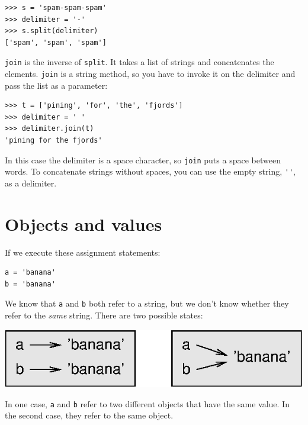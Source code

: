 \documentclass[10pt]{book}
\begin{document}

\beforeverb
\begin{verbatim}
>>> s = 'spam-spam-spam'
>>> delimiter = '-'
>>> s.split(delimiter)
['spam', 'spam', 'spam']
\end{verbatim}
\afterverb
%
{\tt join} is the inverse of {\tt split}.  It
takes a list of strings and
concatenates the elements.  {\tt join} is a string method,
so you have to invoke it on the delimiter and pass the
list as a parameter:


\beforeverb
\begin{verbatim}
>>> t = ['pining', 'for', 'the', 'fjords']
>>> delimiter = ' '
>>> delimiter.join(t)
'pining for the fjords'
\end{verbatim}
\afterverb
%
In this case the delimiter is a space character, so
{\tt join} puts a space between words.  To concatenate
strings without spaces, you can use the empty string,
\verb"''", as a delimiter. 



\section{Objects and values}


If we execute these assignment statements:

\beforeverb
\begin{verbatim}
a = 'banana'
b = 'banana'
\end{verbatim}
\afterverb
%
We know that {\tt a} and {\tt b} both refer to a
string, but we don't
know whether they refer to the {\em same} string.
There are two possible states:


\beforefig
\centerline{\includegraphics{figs/list1.eps}}
\afterfig

In one case, {\tt a} and {\tt b} refer to two different objects that
have the same value.  In the second case, they refer to the same
object.
\end{document}
